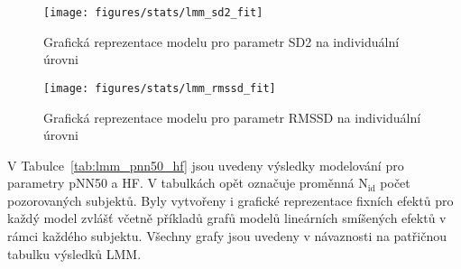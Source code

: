 \begin{figure}[!htb]
    \begin{center}
        \texttt{[image: figures/stats/lmm\_sd2\_fit]}
        \caption{Grafická reprezentace modelu pro parametr SD2 na individuální úrovni}
        \label{fig:results_lmm_fit1}
    \end{center}
    \vspace{-10mm}
\end{figure}

\begin{figure}[!htb]
    \begin{center}
        \texttt{[image: figures/stats/lmm\_rmssd\_fit]}
        \caption{Grafická reprezentace modelu pro parametr RMSSD na individuální úrovni}
        \label{fig:results_lmm_fit2}
    \end{center}
\end{figure}

V Tabulce~\ref{tab:lmm_pnn50_hf} jsou uvedeny výsledky modelování pro parametry
pNN50 a HF. V tabulkách opět označuje proměnná $\mathrm{N}_{\text{id}}$ počet
pozorovaných subjektů. Byly vytvořeny i grafické reprezentace fixních efektů pro
každý model zvlášť včetně příkladů grafů modelů lineárních smíšených efektů v
rámci každého subjektu. Všechny grafy jsou uvedeny v návaznosti na patřičnou
tabulku výsledků \gls{LMM}.

